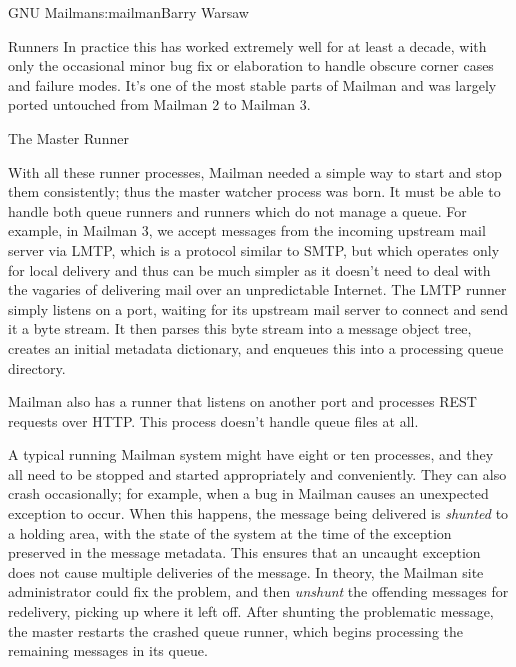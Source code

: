 \begin{aosachapter}{GNU Mailman}{s:mailman}{Barry Warsaw}
\begin{aosasect1}{Runners}
In practice this has worked extremely well for at least a decade, with
only the occasional minor bug fix or elaboration to handle obscure
corner cases and failure modes.  It's one of the most stable parts of
Mailman and was largely ported untouched from Mailman 2 to Mailman 3.

\end{aosasect1}

\begin{aosasect1}{The Master Runner}

With all these runner processes, Mailman needed a simple way to start
and stop them consistently;  thus the master watcher process was born.
It must be able to handle both queue runners and runners which do
not manage a queue.  For example, in Mailman 3, we accept messages
from the incoming upstream mail server via LMTP, which is a protocol
similar to SMTP, but which operates only for local delivery and thus
can be much simpler as it doesn't need to deal with the vagaries of
delivering mail over an unpredictable Internet.  The LMTP runner
simply listens on a port, waiting for its upstream mail server to
connect and send it a byte stream.  It then parses this byte stream
into a message object tree, creates an initial metadata dictionary,
and enqueues this into a processing queue directory.

Mailman also has a runner that listens on another port and processes
REST requests over HTTP.  This process doesn't handle queue files at
all.

A typical running Mailman system might have eight or ten processes, and
they all need to be stopped and started appropriately and
conveniently.  They can also crash occasionally; for example, when a
bug in Mailman causes an unexpected exception to occur.  When this
happens, the message being delivered is \emph{shunted} to a holding
area, with the state of the system at the time of the exception
preserved in the message metadata.  This ensures that an uncaught
exception does not cause multiple deliveries of the message.  In
theory, the Mailman site administrator could fix the problem, and then
\emph{unshunt} the offending messages for redelivery, picking up where
it left off.  After shunting the problematic message, the master
restarts the crashed queue runner, which begins processing the
remaining messages in its queue.


\end{aosasect1}
\end{aosachapter}
